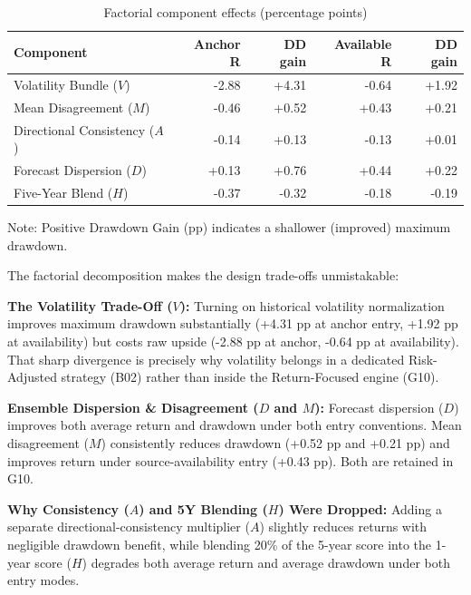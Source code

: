 \documentclass[11pt,a4paper]{article}
\numberwithin{table}{section}
\begin{document}
\begin{minipage}{\linewidth}
\begin{center}\small\setlength{\tabcolsep}{3pt}\renewcommand{\arraystretch}{1.18}
\begin{longtable}{@{}lrrrr@{}}
\caption{Factorial component effects (percentage points)}\\
\toprule
Component & Anchor R & DD gain & Available R & DD gain\\\midrule\endhead
Volatility Bundle ($V$) & -2.88 & +4.31 & -0.64 & +1.92\\
Mean Disagreement ($M$) & -0.46 & +0.52 & +0.43 & +0.21\\
Directional Consistency ($A$) & -0.14 & +0.13 & -0.13 & +0.01\\
Forecast Dispersion ($D$) & +0.13 & +0.76 & +0.44 & +0.22\\
Five-Year Blend ($H$) & -0.37 & -0.32 & -0.18 & -0.19\\
\bottomrule\end{longtable}\end{center}
\end{minipage}\par
Note: Positive Drawdown Gain (pp) indicates a shallower (improved) maximum drawdown.

The factorial decomposition makes the design trade-offs unmistakable:

\textbf{The Volatility Trade-Off ($V$):}  Turning on historical volatility normalization improves maximum drawdown substantially (+4.31 pp at anchor entry, +1.92 pp at availability) but costs raw upside (-2.88 pp at anchor, -0.64 pp at availability). That sharp divergence is precisely why volatility belongs in a dedicated Risk-Adjusted strategy (B02) rather than inside the Return-Focused engine (G10).

\textbf{Ensemble Dispersion \& Disagreement ($D$ and $M$):}  Forecast dispersion ($D$) improves both average return and drawdown under both entry conventions. Mean disagreement ($M$) consistently reduces drawdown (+0.52 pp and +0.21 pp) and improves return under source-availability entry (+0.43 pp). Both are retained in G10.

\textbf{Why Consistency ($A$) and 5Y Blending ($H$) Were Dropped:}  Adding a separate directional-consistency multiplier ($A$) slightly reduces returns with negligible drawdown benefit, while blending 20\% of the 5-year score into the 1-year score ($H$) degrades both average return and average drawdown under both entry modes.
\end{document}
